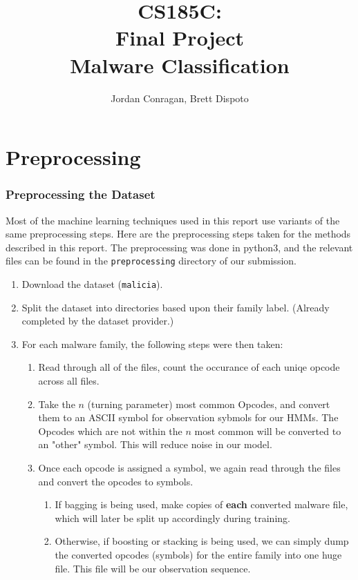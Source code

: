 \documentclass[12pt]{article}
\title{CS185C: \\ 
Final Project \\
Malware Classification}
\author{Jordan Conragan,  Brett Dispoto}
\begin{document}
\maketitle
\tableofcontents
\newpage

\part{Preprocessing}
\section{Preprocessing the Dataset}
Most of the machine learning techniques used in this report use variants of the same preprocessing steps. Here are the preprocessing steps taken for the methods described in this report. The preprocessing was done in python3, and the relevant files can be found in the \texttt{preprocessing} directory of our submission.
  \begin{enumerate}
    \item Download the dataset (\texttt{malicia}).
    \item Split the dataset into directories based upon their family label. (Already completed by the dataset provider.)
    \item For each malware family, the following steps were then taken:
      \begin{enumerate}
        \item Read through all of the files, count the occurance of each uniqe opcode across all files.
        \item Take the $n$ (turning parameter) most common Opcodes, and convert them to an ASCII symbol for observation sybmols for our HMMs. The Opcodes which are not within the $n$ most common will be converted to an "other" symbol. This will reduce noise in our model.
        \item Once each opcode is assigned a symbol, we again read through the files and convert the opcodes to symbols.

        \begin{enumerate}
          \item If bagging is being used, make copies of \textbf{each} converted malware file, which will later be split up accordingly during training.
          \item Otherwise, if boosting or stacking is being used, we can simply dump the converted opcodes (symbols) for the entire family into one huge file. This file will be our observation sequence.
        \end{enumerate}
      \end{enumerate}
  \end{enumerate}
\end{document}

